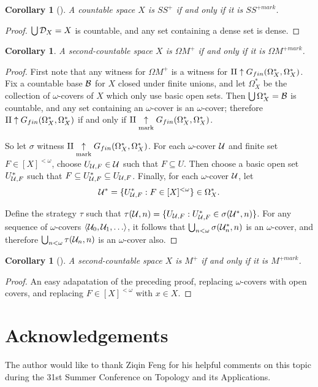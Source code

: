 \documentclass{amsart}
\theoremstyle{plain}
\newtheorem{corollary}[theorem]{Corollary}
\theoremstyle{definition}
\theoremstyle{remark}
\theoremstyle{plain}
\theoremstyle{definition}
\theoremstyle{remark}
\begin{document}
\begin{corollary}[\cite{MR2868880}]
  A countable space \(X\) is \(SS^+\) if and only if it is
  \(SS^{+mark}\).
\end{corollary}

\begin{proof}
  \(\bigcup\mathcal{D}_X=X\) is countable, and any set containing a dense
  set is dense.
\end{proof}

\begin{corollary}
  A second-countable space \(X\) is \(\Omega M^+\) if and only if
  it is \(\Omega M^{+mark}\).
\end{corollary}

\begin{proof}
  First note that any witness for
  \(\Omega M^+\) is a witness for
  \(\mathrm{II}\uparrow G_{fin}(\Omega_X^*,\Omega_X^*)\).
  Fix a countable base \(\mathcal{B}\) for \(X\) closed under finite unions, and let
  \(\Omega_X^*\) be the collection of \(\omega\)-covers of \(X\) which only
  use basic open sets. Then
  \(\bigcup\Omega_X^*=\mathcal{B}\) is countable, and any set containing an
  \(\omega\)-cover is an \(\omega\)-cover; therefore
  \(\mathrm{II}\uparrow G_{fin}(\Omega_X^*,\Omega_X^*)\) if and only if
  \(\mathrm{II}\underset{\text{mark}}{\uparrow}G_{fin}(\Omega_X^*,\Omega_X^*)\).

  So let \(\sigma\) witness
  \(\mathrm{II}\underset{\text{mark}}{\uparrow}G_{fin}(\Omega_X^*,\Omega_X^*)\).
  For each \(\omega\)-cover \(\mathcal{U}\) and finite set \(F\in[X]^{<\omega}\),
  choose \(U_{\mathcal{U},F}\in\mathcal{U}\) such that \(F\subseteq U\). Then choose a
  basic open set \(U_{\mathcal{U},F}^*\) such that
  \(F\subseteq U_{\mathcal{U},F}^*\subseteq U_{\mathcal{U},F}\). Finally, for each
  \(\omega\)-cover \(\mathcal{U}\), let
  \[
    \mathcal{U}^*
      =
    \{
      U_{\mathcal{U},F}^*
        :
      F\in[X]^{<\omega}
    \}
      \in
    \Omega_X^*
  .\]

  Define the strategy \(\tau\) such that
  \(\tau(\mathcal{U},n)=\{U_{\mathcal{U},F}:U_{\mathcal{U},F}^*\in\sigma(\mathcal{U}^*,n)\}\).
  For any sequence of \(\omega\)-covers \(\<\mc U_0,\mc U_1,\dots\>\),
  it follows that \(\bigcup_{n<\omega}\sigma(\mathcal{U}_n^*,n)\) is an
  \(\omega\)-cover, and therefore
  \(\bigcup_{n<\omega}\tau(\mathcal{U}_n,n)\) is an \(\omega\)-cover also.
\end{proof}

\begin{corollary}[\cite{clontzMengerGamePreprint}]
  A second-countable space \(X\) is \(M^+\) if and only if
  it is \(M^{+mark}\).
\end{corollary}

\begin{proof}
  An easy adapatation of the preceding proof, replacing \(\omega\)-covers
  with open covers, and replacing \(F\in[X]^{<\omega}\) with \(x\in X\).
\end{proof}

\section{Acknowledgements}
The author would like to thank Ziqin Feng for his helpful comments on
this topic during
the 31st Summer Conference on Topology and its Applications.



\end{document}
